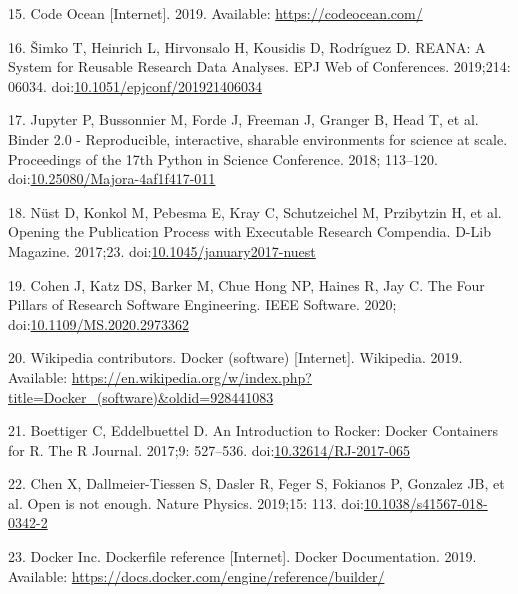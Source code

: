 \documentclass[10pt,letterpaper]{article}
\begin{document}
\leavevmode\hypertarget{ref-code_ocean_2019}{}%
15. Code Ocean {[}Internet{]}. 2019. Available:
\url{https://codeocean.com/}

\leavevmode\hypertarget{ref-simko_reana_2019}{}%
16. Šimko T, Heinrich L, Hirvonsalo H, Kousidis D, Rodríguez D. REANA: A
System for Reusable Research Data Analyses. EPJ Web of Conferences.
2019;214: 06034.
doi:\href{https://doi.org/10.1051/epjconf/201921406034}{10.1051/epjconf/201921406034}

\leavevmode\hypertarget{ref-jupyter_binder_2018}{}%
17. Jupyter P, Bussonnier M, Forde J, Freeman J, Granger B, Head T, et
al. Binder 2.0 - Reproducible, interactive, sharable environments for
science at scale. Proceedings of the 17th Python in Science Conference.
2018; 113--120.
doi:\href{https://doi.org/10.25080/Majora-4af1f417-011}{10.25080/Majora-4af1f417-011}

\leavevmode\hypertarget{ref-nust_opening_2017}{}%
18. Nüst D, Konkol M, Pebesma E, Kray C, Schutzeichel M, Przibytzin H,
et al. Opening the Publication Process with Executable Research
Compendia. D-Lib Magazine. 2017;23.
doi:\href{https://doi.org/10.1045/january2017-nuest}{10.1045/january2017-nuest}

\leavevmode\hypertarget{ref-cohen_four_2020}{}%
19. Cohen J, Katz DS, Barker M, Chue Hong NP, Haines R, Jay C. The Four
Pillars of Research Software Engineering. IEEE Software. 2020;
doi:\href{https://doi.org/10.1109/MS.2020.2973362}{10.1109/MS.2020.2973362}

\leavevmode\hypertarget{ref-wikipedia_contributors_docker_2019}{}%
20. Wikipedia contributors. Docker (software) {[}Internet{]}. Wikipedia.
2019. Available:
\url{https://en.wikipedia.org/w/index.php?title=Docker_(software)\&oldid=928441083}

\leavevmode\hypertarget{ref-boettiger_introduction_2017}{}%
21. Boettiger C, Eddelbuettel D. An Introduction to Rocker: Docker
Containers for R. The R Journal. 2017;9: 527--536.
doi:\href{https://doi.org/10.32614/RJ-2017-065}{10.32614/RJ-2017-065}

\leavevmode\hypertarget{ref-chen_open_2019}{}%
22. Chen X, Dallmeier-Tiessen S, Dasler R, Feger S, Fokianos P, Gonzalez
JB, et al. Open is not enough. Nature Physics. 2019;15: 113.
doi:\href{https://doi.org/10.1038/s41567-018-0342-2}{10.1038/s41567-018-0342-2}

\leavevmode\hypertarget{ref-docker_inc_dockerfile_2019}{}%
23. Docker Inc. Dockerfile reference {[}Internet{]}. Docker
Documentation. 2019. Available:
\url{https://docs.docker.com/engine/reference/builder/}
\end{document}
